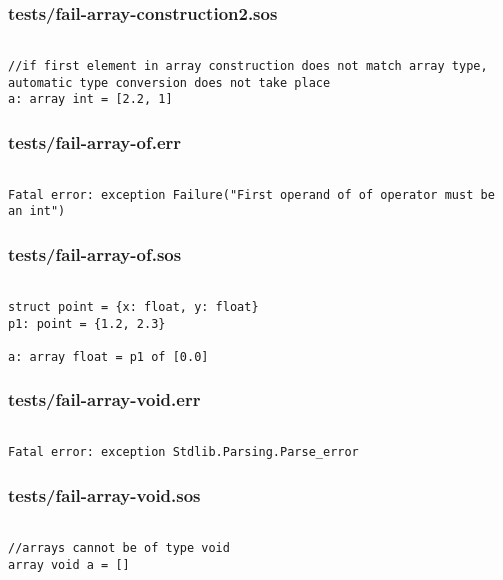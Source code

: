 \documentclass[main.tex]{subfiles}
\begin{document}
\subsubsection{tests/fail-array-construction2.sos}

\begin{lstlisting}

//if first element in array construction does not match array type, automatic type conversion does not take place
a: array int = [2.2, 1]
\end{lstlisting}

\subsubsection{tests/fail-array-of.err}

\begin{lstlisting}

Fatal error: exception Failure("First operand of of operator must be an int")
\end{lstlisting}

\subsubsection{tests/fail-array-of.sos}

\begin{lstlisting}

struct point = {x: float, y: float}
p1: point = {1.2, 2.3}

a: array float = p1 of [0.0]
\end{lstlisting}

\subsubsection{tests/fail-array-void.err}

\begin{lstlisting}

Fatal error: exception Stdlib.Parsing.Parse_error
\end{lstlisting}

\subsubsection{tests/fail-array-void.sos}

\begin{lstlisting}

//arrays cannot be of type void
array void a = []
\end{lstlisting}
\end{document}
